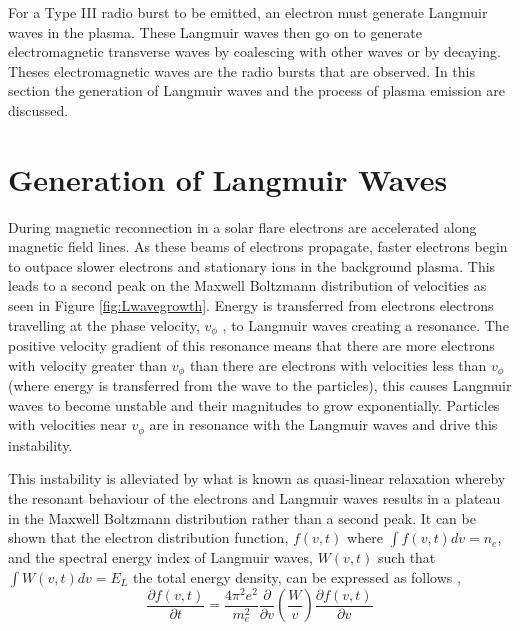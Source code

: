 For a Type III radio burst to be emitted, an electron must generate Langmuir waves in the plasma. These Langmuir waves then go on to generate electromagnetic transverse waves by coalescing with other waves or by decaying. Theses electromagnetic waves are the radio bursts that are observed. In this section the generation of Langmuir waves and the process of plasma emission are discussed.

\section{Generation of Langmuir Waves}
During magnetic reconnection in a solar flare electrons are accelerated along magnetic field lines. As these beams of electrons propagate, faster electrons begin to outpace slower electrons and stationary ions in the background plasma. This leads to a second peak on the Maxwell Boltzmann distribution of velocities as seen in Figure \ref{fig:Lwavegrowth}. Energy is transferred from electrons electrons travelling at the phase velocity, $v_{\phi}$ , to Langmuir waves creating a resonance.
The positive velocity gradient of this resonance means that there are more electrons with velocity greater than $v_{\phi}$ than there are electrons with velocities less than  $v_{\phi}$ (where energy is transferred from the wave to the particles), this causes Langmuir waves to become unstable and their magnitudes to grow exponentially. Particles with velocities near $v_{\phi}$ are in resonance with the Langmuir waves and drive this instability.

This instability is alleviated by what is known as quasi-linear relaxation \citep{Melrose1987} whereby the resonant behaviour of the electrons and Langmuir waves results in a plateau in the Maxwell Boltzmann distribution rather than a second peak. It can be shown that \citep{Vedenov1963} the electron distribution function, $f(v,t)$ where $\int f(v,t) dv = n_e$, and the spectral energy index of Langmuir waves, $W(v,t)$ such that $\int W(v,t) dv = E_L$ the total energy density, can be expressed as follows \citep{Reid2014},
\begin{equation}\label{eq:dfdt}
    \frac{\partial f(v,t)}{\partial t}=\frac{4 \pi^2 e^2}{m_e^2} \frac{\partial}{\partial v} \left( \frac{W}{v} \right) \frac{\partial f(v,t)}{\partial v}
\end{equation}

